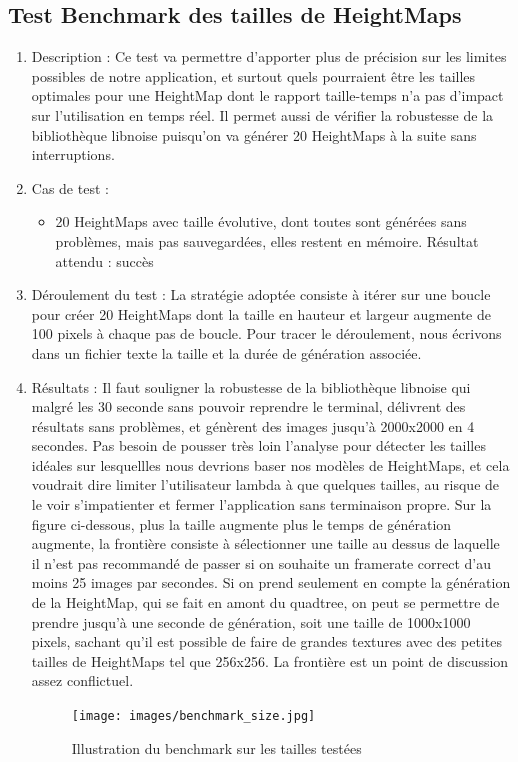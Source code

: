 \documentclass[12pt]{report}
\begin{document}
\subsection{Test Benchmark des tailles de HeightMaps}
\begin{enumerate}
    \item Description : Ce test va permettre d'apporter plus de précision sur les limites possibles de notre application, et surtout quels pourraient être les tailles optimales pour une HeightMap dont le rapport taille-temps n'a pas d'impact sur l'utilisation en temps réel. Il permet aussi de vérifier la robustesse de la bibliothèque libnoise puisqu'on va générer 20 HeightMaps à la suite sans interruptions.
    \item Cas de test :
    \begin{itemize}
        \item 20 HeightMaps avec taille évolutive, dont toutes sont générées sans problèmes, mais pas sauvegardées, elles restent en mémoire. Résultat attendu : succès
    \end{itemize}
    \item Déroulement du test : La stratégie adoptée consiste à itérer sur une boucle pour créer 20 HeightMaps dont la taille en hauteur et largeur augmente de 100 pixels à chaque pas de boucle. Pour tracer le déroulement, nous écrivons dans un fichier texte la taille et la durée de génération associée.
    \item Résultats : Il faut souligner la robustesse de la bibliothèque libnoise qui malgré les 30 seconde sans pouvoir reprendre le terminal, délivrent des résultats sans problèmes, et génèrent des images jusqu'à 2000x2000 en 4 secondes. Pas besoin de pousser très loin l'analyse pour détecter les tailles idéales sur lesquellles nous devrions baser nos modèles de HeightMaps, et cela voudrait dire limiter l'utilisateur lambda à que quelques tailles, au risque de le voir s'impatienter et fermer l'application sans terminaison propre. Sur la figure ci-dessous, plus la taille augmente plus le temps de génération augmente, la frontière consiste à sélectionner une taille au dessus de laquelle il n'est pas recommandé de passer si on souhaite un framerate correct d'au moins 25 images par secondes. Si on prend seulement en compte la génération de la HeightMap, qui se fait en amont du quadtree, on peut se permettre de prendre jusqu'à une seconde de génération, soit une taille de 1000x1000 pixels, sachant qu'il est possible de faire de grandes textures avec des petites tailles de HeightMaps tel que 256x256. La frontière est un point de discussion assez conflictuel.
    
    \begin{figure}[h]
    \begin{center}
    \texttt{[image: images/benchmark\_size.jpg]}
    \caption{Illustration du benchmark sur les tailles testées}
    \end{center}
\end{figure}
    
\end{enumerate}
\end{document}

